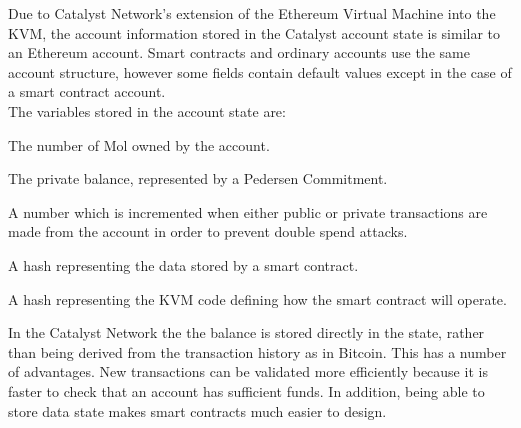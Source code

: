 Due to Catalyst Network’s extension of the Ethereum Virtual Machine into the KVM, the account information stored in the Catalyst account state is similar to an Ethereum account. Smart contracts and ordinary accounts use the same account structure, however some fields contain default values except in the case of a smart contract account. \\

The variables stored in the account state are:

\begin{description}[labelwidth=2cm, leftmargin=!]
\item [Balance] The number of Mol \cite{KATUnit} owned by the account.
\item [Commitment] The private balance, represented by a Pedersen Commitment.
\item [Nonce] A number which is incremented when either public or private transactions are made from the account in order to prevent double spend attacks.
\item [StorageRoot] A hash representing the data stored by a smart contract.
\item [CodeHash] A hash representing the KVM code defining how the smart contract will operate.
\end{description}
\vspace{0.75em}
In the Catalyst Network the the balance is stored directly in the state, rather than being derived from the transaction history as in Bitcoin. This has a number of advantages. New transactions can be validated more efficiently because it is faster to check that an account has sufficient funds. In addition, being able to store data state makes smart contracts much easier to design.